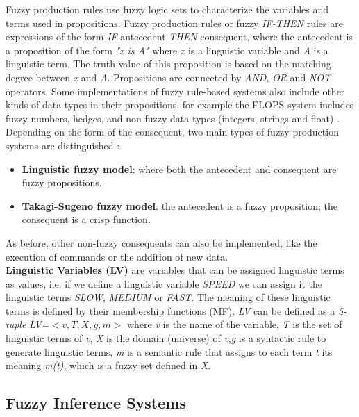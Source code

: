 Fuzzy production rules use fuzzy logic sets to characterize the
variables and terms used in propositions. Fuzzy
production rules or fuzzy \textit{IF-THEN} rules are expressions of
the form \textit{IF} antecedent \textit{THEN} consequent, where the
antecedent is a proposition of the form \textit{"x is A"} where
\textit{x} is a linguistic variable and \textit{A} is a linguistic
term. The truth value of this proposition is based on the matching
degree between \textit{x} and \textit{A}. Propositions are connected
by \textit{AND}, \textit{OR} and \textit{NOT} operators. Some
implementations of fuzzy rule-based systems also include other kinds
of data types in their propositions, for example the FLOPS system
includes fuzzy numbers, hedges, and non fuzzy data types (integers,
strings and float)  \cite{siler2005fuzzy}. Depending on the form of the
consequent, two main types of fuzzy production systems are
distinguished  \cite{babuvska1996fuzzy}:
\begin{itemize}  
\item \textbf{Linguistic fuzzy model}: where both the antecedent 
and consequent are fuzzy propositions.
\item \textbf{Takagi-Sugeno fuzzy model}: the antecedent is a fuzzy 
proposition; the consequent is a crisp function.
\end{itemize}  
As before, other non-fuzzy consequents can also be implemented, like
the execution of commands or the addition of new data.\\
\textbf{Linguistic Variables (LV)} are variables that can be assigned
linguistic terms as values, i.e. if we define a linguistic variable
\textit{SPEED} we can assign it the linguistic terms \textit{SLOW},
\textit{MEDIUM} or \textit{FAST}. The meaning of these linguistic
terms is defined by their membership functions (MF). \textit{LV} can
be defined as a \textit{5-tuple} \textit{LV=}$<v,T,X,g,m>$ where
\textit{v} is the name of the variable, \textit{T} is the set of
linguistic terms of \textit{v}, \textit{X} is the domain (universe) of
\textit{v},\textit{g} is a syntactic rule to generate linguistic terms,
\textit{m} is a semantic rule that assigns to each term \textit{t} its
meaning \textit{m(t)}, which is a fuzzy set defined in \textit{X}.

\subsection{Fuzzy Inference Systems}

